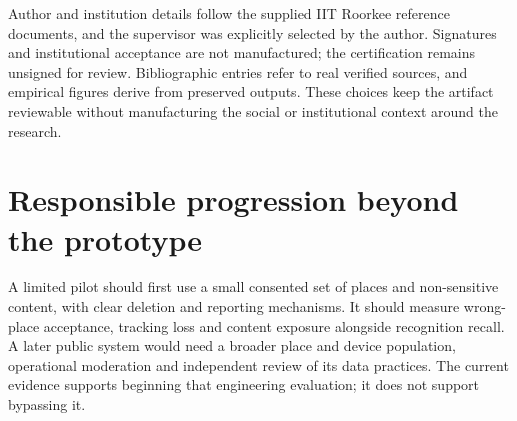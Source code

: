 Author and institution details follow the supplied IIT Roorkee reference documents, and the supervisor was explicitly selected by the author. Signatures and institutional acceptance are not manufactured; the certification remains unsigned for review. Bibliographic entries refer to real verified sources, and empirical figures derive from preserved outputs. These choices keep the artifact reviewable without manufacturing the social or institutional context around the research.
\fi

\section{Responsible progression beyond the prototype}
A limited pilot should first use a small consented set of places and non-sensitive content, with clear deletion and reporting mechanisms. It should measure wrong-place acceptance, tracking loss and content exposure alongside recognition recall. A later public system would need a broader place and device population, operational moderation and independent review of its data practices. The current evidence supports beginning that engineering evaluation; it does not support bypassing it.
